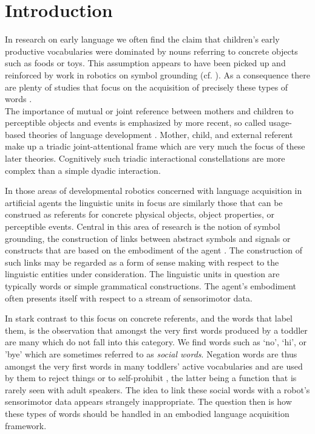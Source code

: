 \section{Introduction}
In research on early language we often find the claim that children's early productive vocabularies were dominated by nouns referring to
concrete objects such as foods or toys. This assumption appears to have been picked up and reinforced by work in robotics on symbol grounding
(cf. \cite{Stramandinoli2017}). As a consequence there are plenty of studies that focus on the acquisition of precisely these
types of words \cite{Hollich2000}.\\
The importance of mutual or joint reference between mothers and children to perceptible objects and events is emphasized by more recent, so called
usage-based theories of language development \cite{Tomasello2003}. Mother, child, and external referent make up a triadic joint-attentional
frame which are very much the focus of these later theories. Cognitively such triadic interactional constellations are more complex than a simple
dyadic interaction.

In those areas of developmental robotics concerned with language acquisition in artificial agents the linguistic units in focus are similarly those
that can be construed as referents for concrete physical objects, object properties, or perceptible events.
Central in this area of research is the notion of symbol grounding, the construction of links between abstract symbols and signals or constructs that are
based on the embodiment of the agent \cite{Harnad1990}. The construction of such links may be regarded as a form of sense making with respect to the 
linguistic entities under consideration. The linguistic units in question are typically words or simple grammatical constructions. The agent's embodiment 
often presents itself with respect to a stream of sensorimotor data. 

In stark contrast to this focus on concrete referents, and the words that label them, is the observation that amongst the very first words produced
by a toddler are many which do not fall into this category. We find words such as `no', `hi', or 'bye' \cite{Fenson1994} which are sometimes referred
to as \emph{social words}. Negation words are thus amongst the very first words in many toddlers' active vocabularies and are used by them to
reject things or to self-prohibit \cite{Gopnik1988,Volterra1979}, the latter being a function that is rarely seen with adult speakers.
The idea to link these social words with a robot's sensorimotor data appears strangely inappropriate. The question then is how these types
of words should be handled in an embodied language acquisition framework.

